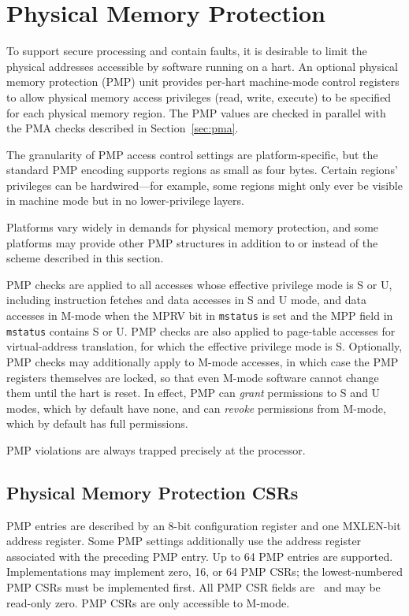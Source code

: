 \section{Physical Memory Protection}
\label{sec:pmp}

To support secure processing and contain faults, it is desirable to
limit the physical addresses accessible by software running on a hart.
An optional physical memory protection (PMP) unit provides
per-hart machine-mode control registers to allow
physical memory access privileges (read, write, execute) to be
specified for each physical memory region.  The PMP values are checked
in parallel with the PMA checks described in Section~\ref{sec:pma}.

The granularity of PMP access control settings are platform-specific,
but the standard PMP
encoding supports regions as small as four bytes.  Certain regions' privileges
can be hardwired---for example, some regions might only ever be visible in
machine mode but in no lower-privilege layers.

\begin{commentary}
Platforms vary widely in demands for physical memory protection, and
some platforms may provide other PMP structures in addition to or
instead of the scheme described in this section.
\end{commentary}

PMP checks are applied to all accesses whose effective privilege mode is S or
U, including instruction fetches and data accesses in S and U mode, and data
accesses in M-mode when the MPRV bit in {\tt mstatus} is set and the MPP
field in {\tt mstatus} contains S or U.
PMP checks are also applied to page-table
accesses for virtual-address translation, for which the effective
privilege mode is S.  Optionally, PMP checks may additionally apply
to M-mode accesses, in which case the PMP registers themselves are
locked, so that even M-mode software cannot change them until the hart is
reset.  In effect, PMP can {\em grant} permissions to S and U
modes, which by default have none, and can {\em revoke} permissions
from M-mode, which by default has full permissions.

PMP violations are always trapped precisely at the processor.

\subsection{Physical Memory Protection CSRs}

PMP entries are described by an 8-bit configuration register and one MXLEN-bit
address register.  Some PMP settings additionally use the address register
associated with the preceding PMP entry.
Up to 64 PMP entries are supported.
Implementations may implement zero, 16, or 64 PMP CSRs; the lowest-numbered
PMP CSRs must be implemented first.
All PMP CSR fields are \warl\ and may be read-only zero.
PMP CSRs are only accessible to M-mode.

